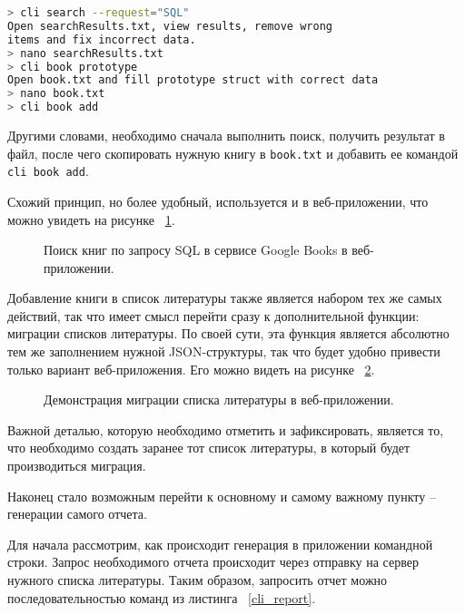 \begin{lstlisting}[language=bash, caption = {Поиск книг по запросу SQL в сервисе Google Books в приложении командной строки.}, captionpos=b, label={cli_search}]
> cli search --request="SQL"
Open searchResults.txt, view results, remove wrong 
items and fix incorrect data.
> nano searchResults.txt 
> cli book prototype
Open book.txt and fill prototype struct with correct data
> nano book.txt
> cli book add
\end{lstlisting}

Другими словами, необходимо сначала выполнить поиск, получить результат в файл, после чего скопировать нужную книгу в
\texttt{book.txt} и добавить ее командой \texttt{cli book add}.

Схожий принцип, но более удобный, используется и в веб-приложении, что можно увидеть на рисунке ~\ref{web_search}.

\begin{figure}[h!]
	\caption{Поиск книг по запросу SQL в сервисе Google Books в веб-приложении.}
	\label{web_search}
\end{figure}

Добавление книги в список литературы также является набором тех же самых действий, так что имеет смысл перейти сразу к дополнительной функции:
миграции списков литературы. По своей сути, эта функция является абсолютно тем же заполнением нужной JSON-структуры, так что будет
удобно привести только вариант веб-приложения. Его можно видеть на рисунке ~\ref{web_migrate}.

\begin{figure}[h!]
	\caption{Демонстрация миграции списка литературы в веб-приложении.}
	\label{web_migrate}
\end{figure}

Важной деталью, которую необходимо отметить и зафиксировать, является то, что необходимо создать заранее тот список литературы, в который
будет производиться миграция.

Наконец стало возможным перейти к основному и самому важному пункту -- генерации самого отчета.

Для начала рассмотрим, как происходит генерация в приложении командной строки. Запрос необходимого отчета
происходит через отправку на сервер нужного списка литературы. Таким образом, запросить отчет можно последовательностью
команд из листинга ~\ref{cli_report}.

